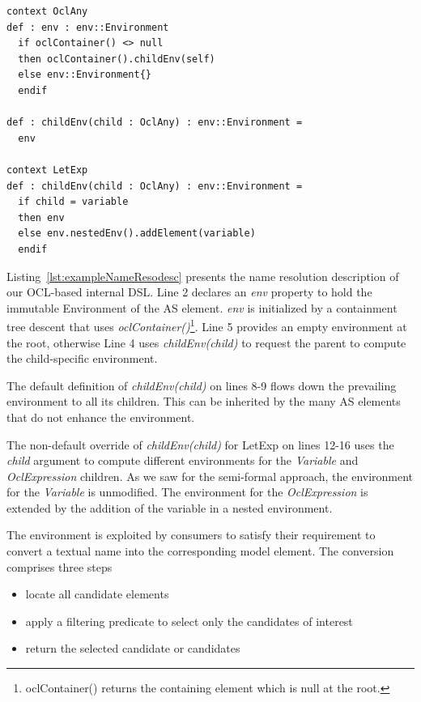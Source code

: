 \documentclass{llncs}
\begin{document}

\begin{lstlisting}[caption=Name resolution producers, label=lst:exampleNameResodesc, language=OCL]  
context OclAny
def : env : env::Environment 
  if oclContainer() <> null
  then oclContainer().childEnv(self)
  else env::Environment{}
  endif

def : childEnv(child : OclAny) : env::Environment =
  env

context LetExp
def : childEnv(child : OclAny) : env::Environment =
  if child = variable
  then env
  else env.nestedEnv().addElement(variable)
  endif
\end{lstlisting}

Listing~\ref{lst:exampleNameResodesc} presents the name resolution description of our OCL-based internal DSL. Line 2 declares an \emph{env} property to hold the immutable Environment of the AS element. \emph{env} is initialized by a containment tree descent that uses \emph{oclContainer()}\footnote{oclContainer() returns the containing element which is null at the root.}. Line 5 provides an empty environment at the root, otherwise Line 4 uses \emph{childEnv(child)} to request the parent to compute the child-specific environment. 

The default definition of \emph{childEnv(child)} on lines 8-9 flows down the prevailing environment to all its children. This can be inherited by the many AS elements that do not enhance the environment.

The non-default override of \emph{childEnv(child)} for LetExp on lines 12-16 uses the \emph{child} argument to compute different environments for the \emph{Variable} and \emph{OclExpression} children. As we saw for the semi-formal approach, the environment for the \emph{Variable} is unmodified. The environment for the \emph{OclExpression} is extended by the addition of the variable in a nested environment. 

The environment is exploited by consumers to satisfy their requirement to convert a textual name into the corresponding model element. The conversion comprises three steps
\begin{itemize}
\item locate all candidate elements
\item apply a filtering predicate to select only the candidates of interest
\item return the selected candidate or candidates
\end{itemize}
\end{document}
